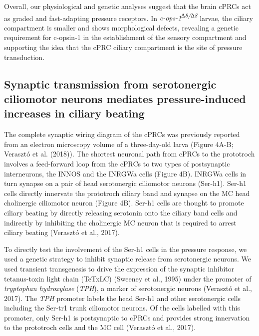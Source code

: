 \documentclass[
  11pt,
]{article}
\begin{document}
Overall, our physiological and genetic analyses suggest that the brain
cPRCs act as graded and fast-adapting pressure receptors. In
\emph{c-ops-1\textsuperscript{∆8/∆8}} larvae, the ciliary compartment is
smaller and shows morphological defects, revealing a genetic requirement
for c-opsin-1 in the establishment of the sensory compartment and
supporting the idea that the cPRC ciliary compartment is the site of
pressure transduction.

\subsection{Synaptic transmission from serotonergic ciliomotor neurons
mediates pressure-induced increases in ciliary
beating}\label{synaptic-transmission-from-serotonergic-ciliomotor-neurons-mediates-pressure-induced-increases-in-ciliary-beating}

The complete synaptic wiring diagram of the cPRCs was previously
reported from an electron microscopy volume of a three-day-old larva
(Figure 4A-B; Verasztó et al. (2018)). The shortest neuronal path from
cPRCs to the prototroch involves a feed-forward loop from the cPRCs to
two types of postsynaptic interneurons, the INNOS and the INRGWa cells
(Figure 4B). INRGWa cells in turn synapse on a pair of head serotonergic
ciliomotor neurons (Ser-h1). Ser-h1 cells directly innervate the
prototroch ciliary band and synapse on the MC head cholinergic
ciliomotor neuron (Figure 4B). Ser-h1 cells are thought to promote
ciliary beating by directly releasing serotonin onto the ciliary band
cells and indirectly by inhibiting the cholinergic MC neuron that is
required to arrest ciliary beating (Verasztó et al., 2017).

To directly test the involvement of the Ser-h1 cells in the pressure
response, we used a genetic strategy to inhibit synaptic release from
serotonergic neurons. We used transient transgenesis to drive the
expression of the synaptic inhibitor tetanus-toxin light chain (TeTxLC)
(Sweeney et al., 1995) under the promoter of \emph{tryptophan
hydroxylase} (\emph{TPH}), a marker of serotonergic neurons (Verasztó et
al., 2017). The \emph{TPH} promoter labels the head Ser-h1 and other
serotonergic cells including the Ser-tr1 trunk ciliomotor neurons. Of
the cells labelled with this promoter, only Ser-h1 is postsynaptic to
cPRCs and provides strong innervation to the prototroch cells and the MC
cell (Verasztó et al., 2017).
\end{document}
